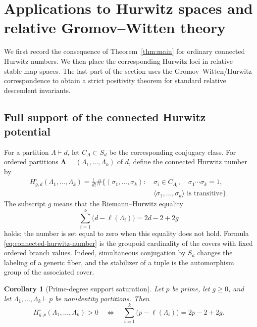 \documentclass[10pt,a4paper]{amsart}
\newtheorem{corollary}[theorem]{Corollary}
\numberwithin{equation}{section}
\begin{document}
\section{Applications to Hurwitz spaces and relative Gromov--Witten theory}
\label{sec:applications}

We first record the consequence of Theorem~\ref{thm:main} for ordinary
connected Hurwitz numbers.  We then place the corresponding Hurwitz loci in
relative stable-map spaces.  The last part of the section uses the
Gromov--Witten/Hurwitz correspondence to obtain a strict positivity theorem
for standard relative descendent invariants.

\subsection{Full support of the connected Hurwitz potential}

For a partition $\Lambda\vdash d$, let $C_\Lambda\subset S_d$ be the
corresponding conjugacy class.  For ordered partitions
$\boldsymbol\Lambda=(\Lambda_1,\ldots,\Lambda_k)$ of $d$, define the
connected Hurwitz number by
\begin{equation}\label{eq:connected-hurwitz-number}
 \begin{split}
 H^\circ_{g,d}(\Lambda_1,\ldots,\Lambda_k)
 =\frac{1}{d!}\#\biggl\{(\sigma_1,\ldots,\sigma_k):\ &
 \sigma_i\in C_{\Lambda_i},\quad \sigma_1\cdots\sigma_k=1,\\[-2pt]
 &\langle\sigma_1,\ldots,\sigma_k\rangle
 \text{ is transitive}\biggr\}.
 \end{split}
\end{equation}
The subscript $g$ means that the Riemann--Hurwitz equality
\begin{equation}\label{eq:application-RH}
 \sum_{i=1}^k\bigl(d-\ell(\Lambda_i)\bigr)=2d-2+2g
\end{equation}
holds; the number is set equal to zero when this equality does not hold.
Formula \eqref{eq:connected-hurwitz-number} is the groupoid cardinality of
the covers with fixed ordered branch values.  Indeed, simultaneous
conjugation by $S_d$ changes the labeling of a generic fiber, and the
stabilizer of a tuple is the automorphism group of the associated cover.

\begin{corollary}[Prime-degree support saturation]
\label{cor:hurwitz-support}
Let $p$ be prime, let $g\geq0$, and let
$\Lambda_1,\ldots,\Lambda_k\vdash p$ be nonidentity partitions.  Then
\begin{equation}\label{eq:hurwitz-support-iff}
 H^\circ_{g,p}(\Lambda_1,\ldots,\Lambda_k)>0
 \quad\Longleftrightarrow\quad
 \sum_{i=1}^k\bigl(p-\ell(\Lambda_i)\bigr)=2p-2+2g.
\end{equation}
\end{corollary}
\end{document}
